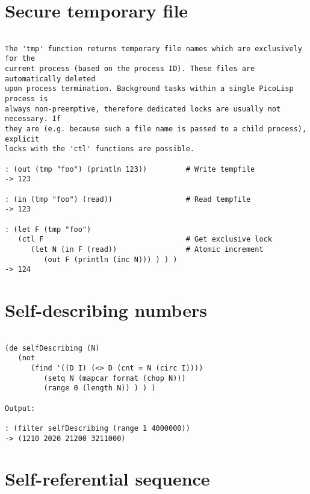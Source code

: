 \section*{Secure temporary file}

\begin{verbatim}

The 'tmp' function returns temporary file names which are exclusively for the
current process (based on the process ID). These files are automatically deleted
upon process termination. Background tasks within a single PicoLisp process is
always non-preemptive, therefore dedicated locks are usually not necessary. If
they are (e.g. because such a file name is passed to a child process), explicit
locks with the 'ctl' functions are possible.

: (out (tmp "foo") (println 123))         # Write tempfile
-> 123

: (in (tmp "foo") (read))                 # Read tempfile
-> 123

: (let F (tmp "foo")
   (ctl F                                 # Get exclusive lock
      (let N (in F (read))                # Atomic increment
         (out F (println (inc N))) ) ) )
-> 124

\end{verbatim}

\section*{Self-describing numbers}

\begin{verbatim}

(de selfDescribing (N)
   (not
      (find '((D I) (<> D (cnt = N (circ I))))
         (setq N (mapcar format (chop N)))
         (range 0 (length N)) ) ) )

Output:

: (filter selfDescribing (range 1 4000000))
-> (1210 2020 21200 3211000)

\end{verbatim}

\section*{Self-referential sequence}

